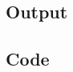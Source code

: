 \documentclass{article}
\begin{document}
\subsection{Output}


\subsection{Code}

\begin{lstlisting}

\end{lstlisting}
\end{document}
